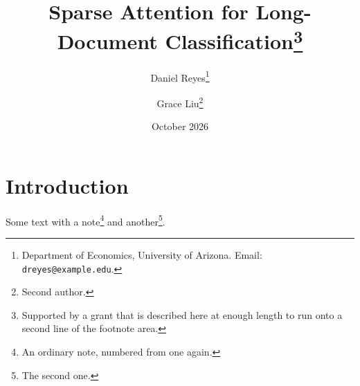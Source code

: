 \documentclass[11pt]{article}
\title{Sparse Attention for Long-Document Classification\thanks{Supported by a grant that is described here at enough length to run onto a second line of the footnote area.}}
\author{Daniel Reyes\thanks{Department of Economics, University of Arizona. Email:
\texttt{dreyes@example.edu}.} \and Grace Liu\footnote{Second author.}}
\date{October 2026}
\begin{document}
\maketitle
\section{Introduction}
Some text with a note\footnote{An ordinary note, numbered from one again.} and another\footnote{The second one.}.
\end{document}
